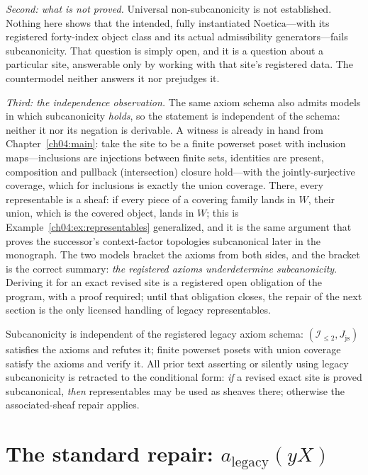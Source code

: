 \emph{Second: what is not proved.} Universal non-subcanonicity is not
established. Nothing here shows that the intended, fully instantiated
$\mathrm{Noetica}$---with its registered forty-index object class and its
actual admissibility generators---fails subcanonicity. That question is
simply open, and it is a question about a particular site, answerable only
by working with that site's registered data. The countermodel neither
answers it nor prejudges it.

\emph{Third: the independence observation.} The same axiom schema also
admits models in which subcanonicity \emph{holds}, so the statement is
independent of the schema: neither it nor its negation is derivable. A
witness is already in hand from Chapter~\ref{ch04:main}: take the site to
be a finite powerset poset with inclusion maps---inclusions are injections
between finite sets, identities are present, composition and pullback
(intersection) closure hold---with the jointly-surjective coverage, which
for inclusions is exactly the union coverage. There, every representable is
a sheaf: if every piece of a covering family lands in $W$, their union,
which is the covered object, lands in $W$; this is
Example~\ref{ch04:ex:representables} generalized, and it is the same
argument that proves the successor's context-factor topologies subcanonical
later in the monograph. The two models bracket the axioms from both sides,
and the bracket is the correct summary: \emph{the registered axioms
underdetermine subcanonicity}. Deriving it for an exact revised site is a
registered open obligation of the program, with a proof required; until
that obligation closes, the repair of the next section is the only
licensed handling of legacy representables.

\begin{finding}\label{ch06:fnd:status}
Subcanonicity is independent of the registered legacy axiom schema:
$(\mathcal{I}_{\le 2},J_{\mathrm{js}})$ satisfies the axioms and refutes
it; finite powerset posets with union coverage satisfy the axioms and
verify it. All prior text asserting or silently using legacy subcanonicity
is retracted to the conditional form: \emph{if} a revised exact site is
proved subcanonical, \emph{then} representables may be used as sheaves
there; otherwise the associated-sheaf repair applies.
\end{finding}

\section{The standard repair: $a_{\mathrm{legacy}}(yX)$}
\label{ch06:sec:repair}

